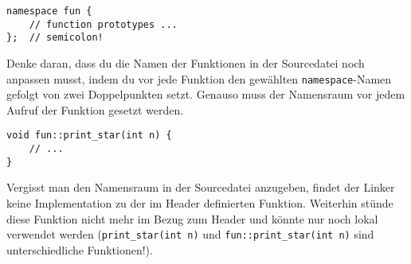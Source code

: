 \begin{lstlisting}
namespace fun {
	// function prototypes ...
};	// semicolon!
\end{lstlisting}

Denke daran, dass du die Namen der Funktionen in der Sourcedatei noch anpassen musst, indem du vor jede Funktion den gewählten \texttt{namespace}-Namen gefolgt von zwei Doppelpunkten setzt. Genauso muss der Namensraum vor jedem Aufruf der Funktion gesetzt werden.

\begin{lstlisting}
void fun::print_star(int n) {
	// ...
}
\end{lstlisting}

Vergisst man den Namensraum in der Sourcedatei anzugeben, findet der Linker keine Implementation zu der im Header definierten Funktion.
Weiterhin stünde diese Funktion nicht mehr im Bezug zum Header und könnte nur noch lokal verwendet werden (\texttt{print\_star(int n)} und \texttt{fun::print\_star(int n)} sind unterschiedliche Funktionen!).
